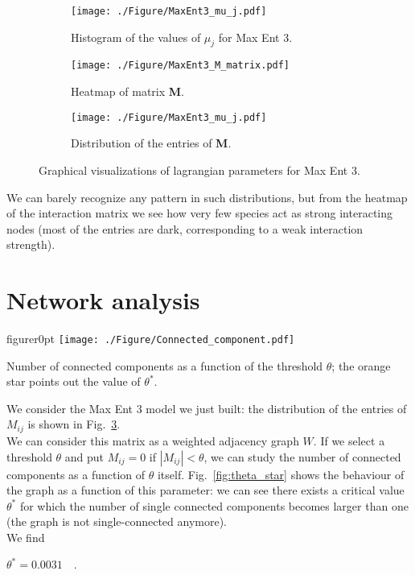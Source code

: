 \documentclass[a4paper,11pt]{article}
\begin{document}
\begin{figure}[htp]
\centering
\begin{subfigure}[b]{0.30\textwidth}
    \centering
    \texttt{[image: ./Figure/MaxEnt3\_mu\_j.pdf]}
    \caption{Histogram of the values of $\mu_j$ for Max Ent 3.}
    \label{fig:maxent3lambda}
\end{subfigure}
\begin{subfigure}[b]{.30\textwidth}
  \centering
  \texttt{[image: ./Figure/MaxEnt3\_M\_matrix.pdf]}
  \caption{Heatmap of matrix \textbf{M}.}
  \label{fig:MaxEnt3_M}
\end{subfigure}%
\begin{subfigure}[b]{.30\textwidth}
  \centering
  \texttt{[image: ./Figure/MaxEnt3\_mu\_j.pdf]}
  \caption{Distribution of the entries of \textbf{M}.}
  \label{fig:MaxEnt3_mu_j}
\end{subfigure}
\caption{Graphical visualizations of lagrangian parameters for Max Ent 3.}
\label{fig:MaxEnt3_lagrangian}
\end{figure}

We can barely recognize any pattern in such distributions, but from the heatmap of the interaction matrix we see how very few species act as strong interacting nodes (most of the entries are dark, corresponding to a weak interaction strength).


\section{Network analysis}

\begin{wrapfloat}{figure}{r}{0pt}
  \texttt{[image: ./Figure/Connected\_component.pdf]}
  \caption{Number of connected components as a function of the threshold $\theta$; the orange star points out the value of $\theta^*$.}
  \label{fig:theta_star}
\end{wrapfloat}

We consider the Max Ent 3 model we just built: the distribution of the entries of $M_{ij}$ is shown in Fig.~\ref{fig:MaxEnt3_mu_j}. 
\\
We can consider this matrix as a weighted adjacency graph $W$. If we select a threshold $\theta$ and put $M_{ij}=0$ if $|M_{ij}|<\theta$, we can study the number of connected components as a function of $\theta$ itself. Fig.~\ref{fig:theta_star} shows the behaviour of the graph as a function of this parameter: we can see there exists a critical value $\theta^*$ for which the number of single connected components becomes larger than one (the graph is not single-connected anymore).
\\
We find 
\begin{center}
    $\theta^* = 0.0031 \quad .$
\end{center}
\end{document}
